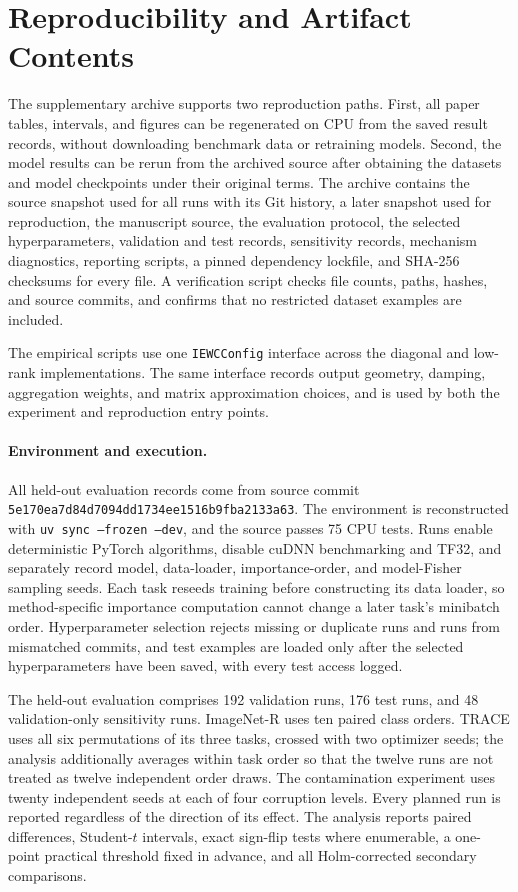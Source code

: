 \section{Reproducibility and Artifact Contents}
\label{app:reproducibility}

The supplementary archive supports two reproduction paths. First, all paper
tables, intervals, and figures can be regenerated on CPU from the saved result
records, without downloading benchmark data or retraining models. Second, the
model results can be rerun from the archived source after obtaining the
datasets and model checkpoints under their original terms. The archive
contains the source snapshot used for all runs with its Git history, a later
snapshot used for reproduction, the manuscript source, the evaluation protocol, the selected hyperparameters,
validation and test records, sensitivity records, mechanism diagnostics,
reporting scripts, a pinned dependency lockfile, and SHA-256 checksums for
every file. A verification script checks file counts, paths, hashes, and source
commits, and confirms that no restricted dataset examples are included.

The empirical scripts use one \texttt{IEWCConfig} interface across the diagonal
and low-rank implementations. The same interface records output geometry,
damping, aggregation weights, and matrix approximation choices, and is used by
both the experiment and reproduction entry points.

\paragraph{Environment and execution.}
All held-out evaluation records come from source commit
\texttt{5e170ea7d84d7094dd1734ee1516b9fba2133a63}. The environment is
reconstructed with \texttt{uv sync --frozen --dev}, and the source passes 75 CPU
tests. Runs enable deterministic PyTorch algorithms, disable cuDNN benchmarking
and TF32, and separately record model, data-loader, importance-order, and
model-Fisher sampling seeds. Each task reseeds training before constructing its
data loader, so method-specific importance computation cannot change a later
task's minibatch order. Hyperparameter selection rejects missing or duplicate
runs and runs from mismatched commits, and test examples are loaded only after
the selected hyperparameters have been saved, with every test access logged.

The held-out evaluation comprises 192 validation runs, 176 test runs, and 48
validation-only sensitivity runs. ImageNet-R uses ten paired class orders.
TRACE uses all six permutations of its three tasks, crossed with two optimizer
seeds; the analysis additionally averages within task order so that the twelve
runs are not treated as twelve independent order draws. The contamination
experiment uses twenty independent seeds at each of four corruption levels.
Every planned run is reported regardless of the direction of its effect. The
analysis reports paired differences, Student-$t$ intervals, exact sign-flip
tests where enumerable, a one-point practical threshold fixed in advance, and
all Holm-corrected secondary comparisons.

